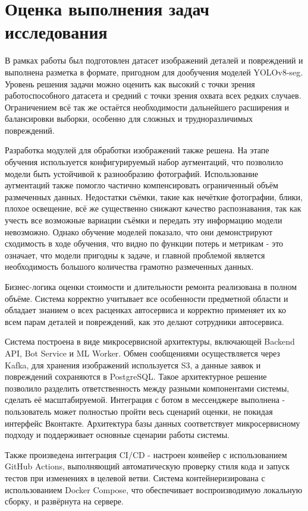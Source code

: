 \section{Оценка выполнения задач исследования}

В рамках работы был подготовлен датасет изображений деталей и повреждений и выполнена разметка в формате, пригодном для дообучения моделей YOLOv8-seg. Уровень решения задачи можно оценить как высокий с точки зрения работоспособного датасета и средний с точки зрения охвата всех редких случаев. Ограничением всё так же остаётся необходимости дальнейшего расширения и балансировки выборки, особенно для сложных и трудноразличимых повреждений.

Разработка модулей для обработки изображений также решена. На этапе обучения используется конфигурируемый набор аугментаций, что позволило модели быть устойчивой к разнообразию фотографий. Использование аугментаций также помогло частично компенсировать ограниченный объём размеченных данных. 
Недостатки съёмки, такие как нечёткие фотографии, блики, плохое освещение, всё же существенно снижают качество распознавания, так как учесть все возможные вариации съёмки и передать эту информацию модели невозможно. 
Однако обучение моделей показало, что они демонстрируют сходимость в ходе обучения, что видно по функции потерь и метрикам - это означает, что модели пригодны к задаче, и главной проблемой является необходимость большого количества грамотно размеченных данных. 

Бизнес-логика оценки стоимости и длительности ремонта реализована в полном объёме. Система корректно учитывает все особенности предметной области и обладает знанием о всех расценках автосервиса и корректно применяет их ко всем парам деталей и повреждений, как это делают сотрудники автосервиса. 

Система построена в виде микросервисной архитектуры, включающей Backend API, Bot Service и ML Worker. Обмен сообщениями осуществляется через Kafka, для хранения изображений используется S3, а данные заявок и повреждений сохраняются в PostgreSQL.  Такое архитектурное решение позволило разделить ответственность между разными компонентами системы, сделать её масштабируемой. Интеграция с ботом в мессенджере выполнена - пользователь может полностью пройти весь сценарий оценки, не покидая интерфейс Вконтакте.
Архитектура базы данных соответствует микросервисному подходу и поддерживает основные сценарии работы системы.

Также произведена интеграция CI/CD - настроен конвейер с использованием GitHub Actions, выполняющий автоматическую проверку стиля кода и запуск тестов при изменениях в целевой ветви. Система контейнеризирована с использованием Docker Compose, что обеспечивает воспроизводимую локальную сборку, и развёрнута на сервере.

